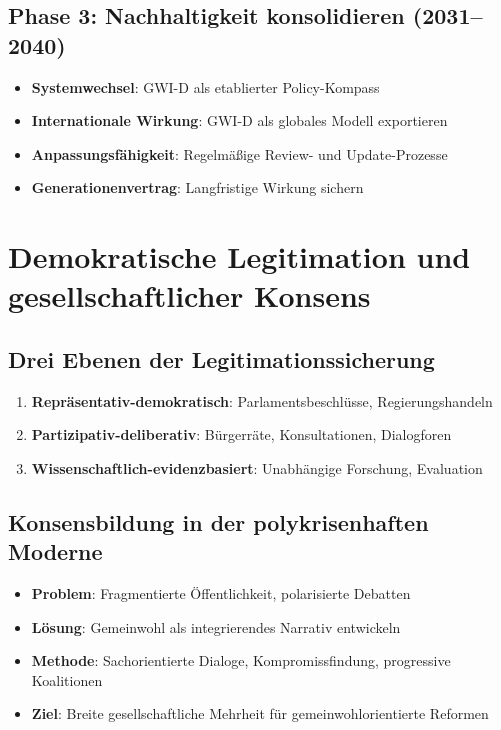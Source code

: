 \subsection{Phase 3: Nachhaltigkeit konsolidieren (2031–2040)}

\begin{itemize}
    \item \textbf{Systemwechsel}: GWI-D als etablierter Policy-Kompass
    \item \textbf{Internationale Wirkung}: GWI-D als globales Modell exportieren
    \item \textbf{Anpassungsfähigkeit}: Regelmäßige Review- und Update-Prozesse
    \item \textbf{Generationenvertrag}: Langfristige Wirkung sichern
\end{itemize}

\section{Demokratische Legitimation und gesellschaftlicher Konsens}

\subsection{Drei Ebenen der Legitimationssicherung}

\begin{enumerate}
    \item \textbf{Repräsentativ-demokratisch}: Parlamentsbeschlüsse, Regierungshandeln
    \item \textbf{Partizipativ-deliberativ}: Bürgerräte, Konsultationen, Dialogforen
    \item \textbf{Wissenschaftlich-evidenzbasiert}: Unabhängige Forschung, Evaluation
\end{enumerate}

\subsection{Konsensbildung in der polykrisenhaften Moderne}

\begin{itemize}
    \item \textbf{Problem}: Fragmentierte Öffentlichkeit, polarisierte Debatten
    \item \textbf{Lösung}: Gemeinwohl als integrierendes Narrativ entwickeln
    \item \textbf{Methode}: Sachorientierte Dialoge, Kompromissfindung, progressive Koalitionen
    \item \textbf{Ziel}: Breite gesellschaftliche Mehrheit für gemeinwohlorientierte Reformen
\end{itemize}


